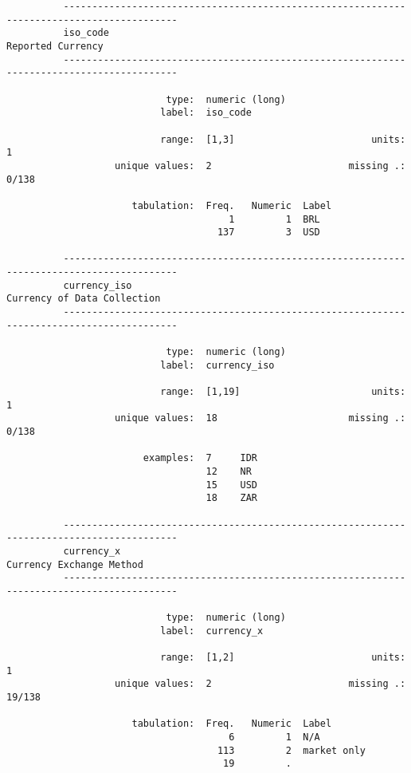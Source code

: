 \documentclass{article}
\begin{document}
\begin{verbatim}
          ------------------------------------------------------------------------------------------
          iso_code                                                                 Reported Currency
          ------------------------------------------------------------------------------------------
          
                            type:  numeric (long)
                           label:  iso_code
          
                           range:  [1,3]                        units:  1
                   unique values:  2                        missing .:  0/138
          
                      tabulation:  Freq.   Numeric  Label
                                       1         1  BRL
                                     137         3  USD
          
          ------------------------------------------------------------------------------------------
          currency_iso                                                   Currency of Data Collection
          ------------------------------------------------------------------------------------------
          
                            type:  numeric (long)
                           label:  currency_iso
          
                           range:  [1,19]                       units:  1
                   unique values:  18                       missing .:  0/138
          
                        examples:  7     IDR
                                   12    NR
                                   15    USD
                                   18    ZAR
          
          ------------------------------------------------------------------------------------------
          currency_x                                                        Currency Exchange Method
          ------------------------------------------------------------------------------------------
          
                            type:  numeric (long)
                           label:  currency_x
          
                           range:  [1,2]                        units:  1
                   unique values:  2                        missing .:  19/138
          
                      tabulation:  Freq.   Numeric  Label
                                       6         1  N/A
                                     113         2  market only
                                      19         .  
          

\end{verbatim}
\end{document}
